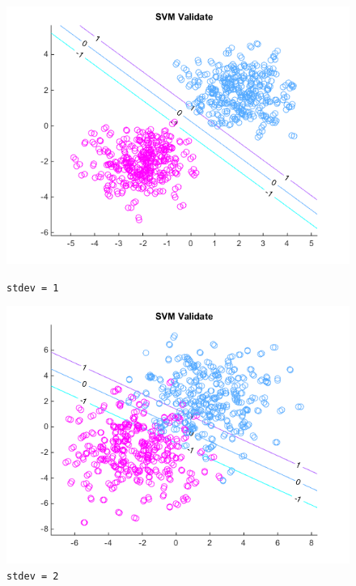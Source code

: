 \documentclass[10pt,letterpaper]{article}
\begin{document}
\begin{center}
\begin{figure}[!htb]
  \includegraphics[width=\linewidth]{figures/stdev1.png}
  \caption{\texttt{stdev = 1}}\label{fig:stdev1}
\endminipage\hfill
{}
  \includegraphics[width=\linewidth]{figures/stdev2.png}
  \caption{\texttt{stdev = 2}}
\endminipage
\end{figure}
\begin{figure}[!htb]

\end{figure}
\end{center}
\end{document}
